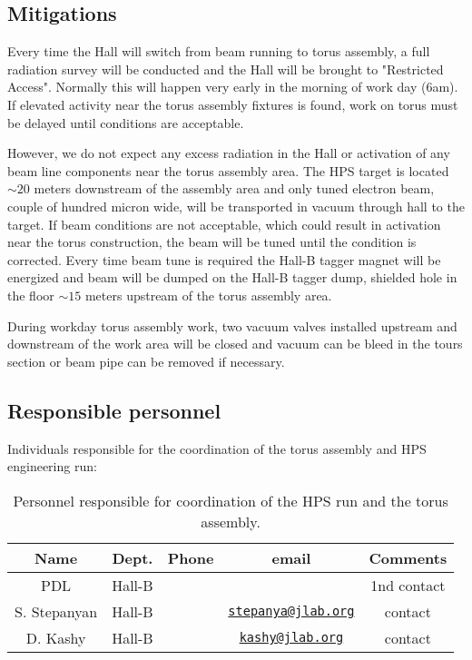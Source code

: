 \documentclass[11pt]{report}
\begin{document}
\subsection{Mitigations}
\indent

Every time the Hall will switch from beam running to torus assembly, a full radiation survey will be conducted and the Hall will be brought to "Restricted Access". Normally this will happen very early in the morning of work day (6am). If elevated activity near the torus assembly fixtures is found, work on torus must be delayed until conditions are acceptable. 

However, we do not expect any excess radiation in the Hall or activation of any beam line components near the torus assembly area. The HPS  target is located $\sim20$ meters downstream of the assembly area and only tuned electron beam, couple of hundred micron wide, will be transported in vacuum through hall to the target. If beam conditions are not acceptable, which could result in activation near the torus construction, the beam will be tuned until the condition is corrected. Every time beam tune is required the Hall-B tagger magnet will be energized and beam will be dumped on the Hall-B tagger dump, shielded hole in the floor $\sim 15$ meters upstream of the torus assembly area. 

During workday torus assembly work, two vacuum valves installed upstream and downstream of the work area will be closed and vacuum can be bleed in the tours section or beam pipe can be removed if necessary.
 
\subsection{Responsible personnel}
\indent

Individuals responsible for the coordination of the torus assembly and HPS engineering run:

\begin{table}[!htb]
 \centering
 \begin{tabular}{|c|c|c|c|c|}
\hline
 Name&Dept.&Phone&email&Comments \\ \hline
PDL & Hall-B&&&1nd contact \\ \hline
S. Stepanyan & Hall-B&&\href{mailto:stepanya@jlab.org}{\nolinkurl{stepanya@jlab.org}}&contact \\ \hline
D. Kashy & Hall-B&&\href{mailto:kashy@jlab.org}{\nolinkurl{kashy@jlab.org}}&contact \\ \hline
 \end{tabular}
\caption{Personnel responsible for coordination of the HPS run and the torus assembly.} 
\label{tb:clas12}
\end{table}
\end{document}
